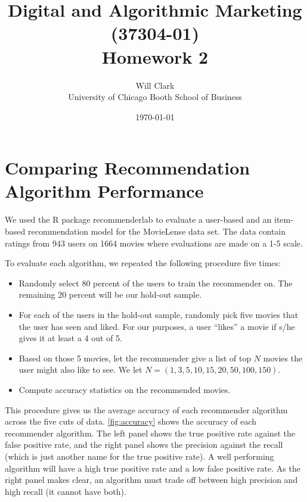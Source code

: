 



\title{Digital and Algorithmic Marketing (37304-01)\\Homework 2}
\author{Will Clark\\
University of Chicago Booth School of Business}
\date{\today}
\maketitle

\section{Comparing Recommendation Algorithm Performance} %

We used the \textsf{R} package \textsf{recommenderlab} to evaluate a user-based and an item-based recommendation model for the MovieLense data set. The data contain ratings from 943 users on 1664 movies where evaluations are made on a 1-5 scale.

To evaluate each algorithm, we repeated the following procedure five times:
\begin{itemize}
\item Randomly select 80 percent of the users to train the recommender on. The remaining 20 percent will be our hold-out sample.
\item For each of the users in the hold-out sample, randomly pick five movies that the user has seen and liked. For our purposes, a user ``likes'' a movie if s/he gives it at least a 4 out of 5.
\item Based on those 5 movies, let the recommender give a list of top $N$ movies the user might also like to see. We let $N=(1,3,5,10,15,20,50,100,150)$.
\item Compute accuracy statistics on the recommended movies.
\end{itemize}
This procedure gives us the average accuracy of each recommender algorithm across the five cuts of data. \cref{fig:accuracy} shows the accuracy of each recommender algorithm. The left panel shows the true positive rate against the false positive rate, and the right panel shows the precision against the recall (which is just another name for the true positive rate). A well performing algorithm will have a high true positive rate and a low false positive rate. As the right panel makes clear, an algorithm must trade off between high precision and high recall (it cannot have both).

